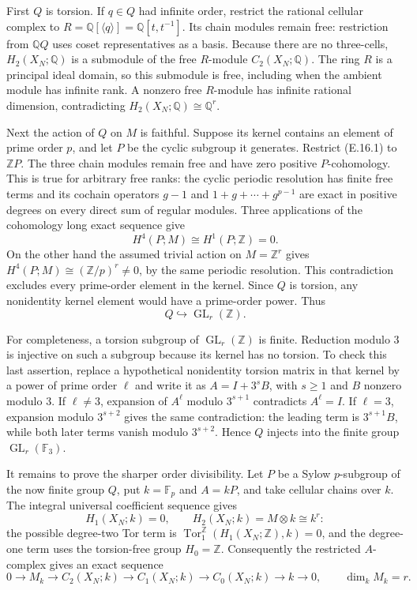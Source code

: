 First $Q$ is torsion. If $q\in Q$ had infinite order, restrict
the rational cellular complex to
$R=\mathbb Q[\langle q\rangle]=\mathbb Q[t,t^{-1}]$.
Its chain modules remain free: restriction from $\mathbb Q Q$
uses coset representatives as a basis. Because there are no
three-cells, $H_2(X_N;\mathbb Q)$ is a submodule of the free
$R$-module $C_2(X_N;\mathbb Q)$. The ring $R$ is a principal
ideal domain, so this submodule is free, including when the
ambient module has infinite rank. A nonzero free $R$-module
has infinite rational dimension, contradicting
$H_2(X_N;\mathbb Q)\cong\mathbb Q^r$.

Next the action of $Q$ on $M$ is faithful. Suppose its kernel
contains an element of prime order $p$, and let $P$ be the
cyclic subgroup it generates. Restrict (E.16.1) to $\mathbb ZP$.
The three chain modules remain free and have zero positive
$P$-cohomology. This is true for arbitrary free ranks: the
cyclic periodic resolution has finite free terms and its
cochain operators $g-1$ and $1+g+\cdots+g^{p-1}$ are exact
in positive degrees on every direct sum of regular modules.
Three applications of the cohomology long exact sequence give
\[
 H^4(P;M)\cong H^1(P;\mathbb Z)=0.
\]
On the other hand the assumed trivial action on $M=\mathbb Z^r$
gives $H^4(P;M)\cong(\mathbb Z/p)^r\ne0$, by the same periodic
resolution. This contradiction excludes every prime-order
element in the kernel. Since $Q$ is torsion, any nonidentity
kernel element would have a prime-order power. Thus
\[
                       Q\hookrightarrow\operatorname{GL}_r(\mathbb Z).
\]

For completeness, a torsion subgroup of
$\operatorname{GL}_r(\mathbb Z)$ is finite. Reduction modulo
$3$ is injective on such a subgroup because its kernel has
no torsion. To check this last assertion, replace a hypothetical
nonidentity torsion matrix in that kernel by a power of prime
order $\ell$ and write it as $A=I+3^sB$, with $s\geq1$ and
$B$ nonzero modulo $3$. If $\ell\ne3$, expansion of $A^\ell$
modulo $3^{s+1}$ contradicts $A^\ell=I$. If $\ell=3$, expansion
modulo $3^{s+2}$ gives the same contradiction: the leading
term is $3^{s+1}B$, while both later terms vanish modulo
$3^{s+2}$. Hence $Q$ injects into the finite group
$\operatorname{GL}_r(\mathbb F_3)$.

It remains to prove the sharper order divisibility. Let $P$ be
a Sylow $p$-subgroup of the now finite group $Q$, put
$k=\mathbb F_p$ and $A=kP$, and take cellular chains over $k$.
The integral universal coefficient sequence gives
\[
 H_1(X_N;k)=0,
 \qquad H_2(X_N;k)=M\otimes k\cong k^r:
\]
the possible degree-two Tor term is
$\operatorname{Tor}_1^{\mathbb Z}(H_1(X_N;\mathbb Z),k)=0$,
and the degree-one term uses the torsion-free group $H_0=\mathbb Z$.
Consequently the restricted $A$-complex gives an exact sequence
\[
 0\longrightarrow M_k\longrightarrow C_2(X_N;k)
 \longrightarrow C_1(X_N;k)\longrightarrow C_0(X_N;k)
 \longrightarrow k\longrightarrow0,
 \qquad \dim_k M_k=r.
 \tag{E.16.2}
\]

